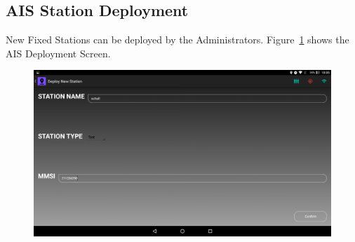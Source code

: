 \subsection{AIS Station Deployment}
\label{subsec:subsec7_2_7}
\noindent
New Fixed Stations can be deployed by the Administrators. Figure~\ref{fig:CH7AISDeployment} shows the AIS Deployment Screen. 
\begin{figure}[h]
	\centering
	\includegraphics[height=0.3\textheight]{fig07/AISDeployment.png}
	\label{fig:CH7AISDeployment}
\end{figure}
%
